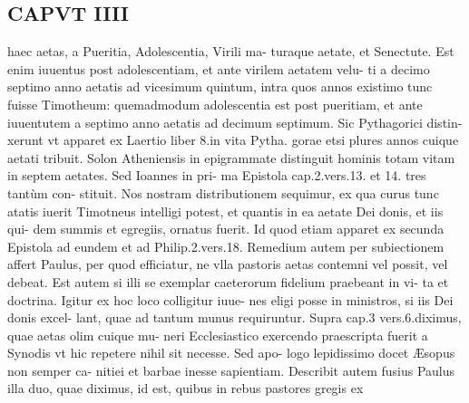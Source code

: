\documentclass{article}
\begin{document}
\begin{pages}
\section*{CAPVT  IIII }
\marginpar{[ p.229 ]}\pstart haec aetas, a Pueritia, Adolescentia, Virili ma- turaque aetate, et Senectute. Est enim iuuentus post adolescentiam, et ante virilem aetatem velu- ti a decimo septimo anno aetatis ad vicesimum quintum, intra quos annos existimo tunc fuisse Timotheum: quemadmodum adolescentia est post pueritiam, et ante iuuentutem a septimo anno aetatis ad decimum septimum. Sic Pythagorici distin- xerunt vt apparet ex Laertio liber 8.in vita Pytha. gorae etsi plures annos cuique aetati tribuit. Solon Atheniensis in epigrammate distinguit hominis totam vitam in septem aetates. Sed Ioannes in pri- ma Epistola cap.2.vers.13. et 14. tres tantùm con- stituit. Nos nostram distributionem sequimur, ex qua curus tunc atatis iuerit Timotneus intelligi potest, et quantis in ea aetate Dei donis, et iis qui- dem summis et egregiis, ornatus fuerit. Id quod etiam apparet ex secunda Epistola ad eundem et ad Philip.2.vers.18.  \pend\pstart Remedium autem per subiectionem affert Paulus, per quod efficiatur, ne vlla pastoris aetas contemni vel possit, vel debeat. Est autem si illi se exemplar caeterorum fidelium praebeant in vi- ta et doctrina. Igitur ex hoc loco colligitur iuue- nes eligi posse in ministros, si iis Dei donis excel- lant, quae ad tantum munus requiruntur. Supra cap.3 vers.6.diximus, quae aetas olim cuique mu- neri Ecclesiastico exercendo praescripta fuerit a Synodis vt hic repetere nihil sit necesse. Sed apo- logo lepidissimo docet Æsopus non semper ca- nitiei et barbae inesse sapientiam.  \pend\pstart Describit autem fusius Paulus illa duo, quae diximus, id est, quibus in rebus pastores gregis ex  \pend

\end{pages}
\end{document}
